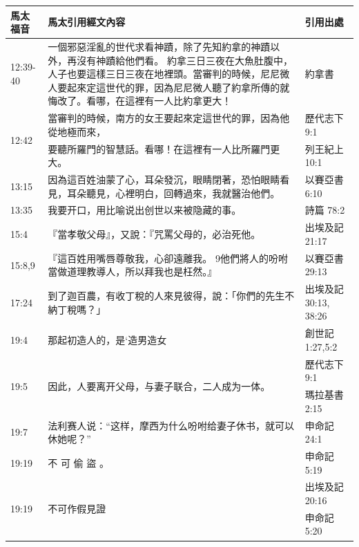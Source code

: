 \begin{table}[htbp]
  \centering
   \begin{tabular}{|p{4.93em}|p{}|p{}|}
    \toprule
    \rowcolor[rgb]{ .749,  .749,  .749} \textcolor[rgb]{ .267,  .447,  .769}{\textbf{馬太福音}} 
    & \textcolor[rgb]{ .267,  .447,  .769}{\textbf{馬太引用經文內容}} 
    & \textcolor[rgb]{ .267,  .447,  .769}{\textbf{引用出處}} \\
    \midrule
    \multicolumn{1}{|p{4.93em}|}{12:39-40} & 一個邪惡淫亂的世代求看神蹟，除了先知約拿的神蹟以外，再沒有神蹟給他們看。 約拿三日三夜在大魚肚腹中，人子也要這樣三日三夜在地裡頭。當審判的時候，尼尼微人要起來定這世代的罪，因為尼尼微人聽了約拿所傳的就悔改了。看哪，在這裡有一人比約拿更大！  & 約拿書  \\
    \midrule
    \multicolumn{1}{|l|}{\multirow{2}[4]{*}{12:42}} & 當審判的時候，南方的女王要起來定這世代的罪，因為他從地極而來， & 歷代志下 9:1 \\
\cmidrule{3-3}          & 要聽所羅門的智慧話。看哪！在這裡有一人比所羅門更大。 & 列王紀上 10:1 \\
    \midrule
    \multicolumn{1}{|p{4.93em}|}{13:15} & 因為這百姓油蒙了心，耳朵發沉，眼睛閉著，恐怕眼睛看見，耳朵聽見，心裡明白，回轉過來，我就醫治他們。 & 以賽亞書 6:10 \\
    \midrule
    \multicolumn{1}{|p{4.93em}|}{13:35} & 我要开口，用比喻说出创世以来被隐藏的事。 & 詩篇 78:2 \\
    \midrule
    \multicolumn{1}{|p{4.93em}|}{15:4} & 『當孝敬父母』，又說：『咒罵父母的，必治死他。 & 出埃及記 21:17 \\
    \midrule
    \multicolumn{1}{|p{4.93em}|}{15:8,9} & 『這百姓用嘴唇尊敬我，心卻遠離我。 9他們將人的吩咐當做道理教導人，所以拜我也是枉然。』 & 以賽亞書 29:13 \\
    \midrule
    \multicolumn{1}{|p{4.93em}|}{17:24} & 到了迦百農，有收丁稅的人來見彼得，說：「你們的先生不納丁稅嗎？」 & 出埃及記 30:13, 38:26 \\
    \midrule
    \multicolumn{1}{|p{4.93em}|}{19:4} & 那起初造人的，是‘造男造女 & 創世記 1:27,5:2 \\
    \midrule
    \multicolumn{1}{|l|}{\multirow{2}[4]{*}{19:5}} & \multirow{2}[4]{*}{因此，人要离开父母，与妻子联合，二人成为一体。} & 歷代志下 9:1 \\
\cmidrule{3-3}          & \multicolumn{1}{l|}{} & 瑪拉基書 2:15 \\
    \midrule
    \multicolumn{1}{|p{4.93em}|}{19:7} & 法利赛人说：“这样，摩西为什么吩咐给妻子休书，就可以休她呢？” & 申命記 24:1 \\
    \midrule
    \multicolumn{1}{|p{4.93em}|}{19:19} & 不 可 偷 盜 。 & 申命記 5:19 \\
    \midrule
    \multicolumn{1}{|l|}{\multirow{2}[4]{*}{19:19}} & \multirow{2}[4]{*}{不可作假見證} 
    	& 出埃及記 20:16 \\
\cmidrule{3-3}          & \multicolumn{1}{l|}{} &申命記 5:20 \\


\end{tabular}
\end{table}
